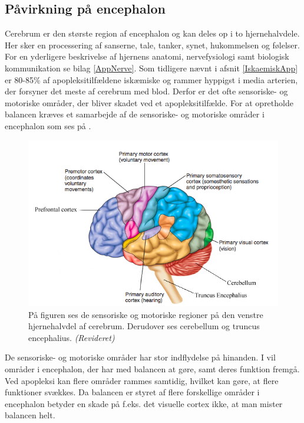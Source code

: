 \subsection{Påvirkning på encephalon}\label{HjerneSenMot}
Cerebrum er den største region af encephalon og kan deles op i to hjernehalvdele. Her sker en processering af sanserne, tale, tanker, synet, hukommelsen og følelser. \cite{Martini2012} For en yderligere beskrivelse af hjernens anatomi, nervefysiologi samt biologisk kommunikation se bilag \ref{AppNerve}. Som tidligere nævnt i afsnit \ref{IskaemiskApp} er 80-85\% af apopleksitilfældene iskæmiske og rammer hyppigst i media arterien, der forsyner det meste af cerebrum med blod. Derfor er det ofte sensoriske- og motoriske områder, der bliver skadet ved et apopleksitilfælde. \cite{Kruuse2015a,Gade2004,Boss2010} For at opretholde balancen kræves et samarbejde af de sensoriske- og motoriske områder i encephalon som ses på .

\begin{figure}[H]
	\centering
	\includegraphics[scale=0.6]{figures/bProblemanalyse/Encephalon3.png}
	\caption{På figuren ses de sensoriske og motoriske regioner på den venstre hjernehalvdel af cerebrum. Derudover ses cerebellum og truncus encephalius. \textit{(Revideret)} \cite{Stanfield2014}}
	\label{Enc}
\end{figure}

De sensoriske- og motoriske områder har stor indflydelse på hinanden. I  vil områder i encephalon, der har med balancen at gøre, samt deres funktion fremgå. Ved apopleksi kan flere områder rammes samtidig, hvilket kan gøre, at flere funktioner svækkes. Da balancen er styret af flere forskellige områder i encephalon betyder en skade på f.eks. det visuelle cortex ikke, at man mister balancen helt. 

